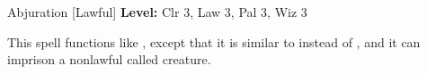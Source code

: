 {Abjuration [Lawful]}
{
	\textbf{Level:}
	Clr 3, Law 3, Pal 3, Wiz 3\\
}
{
	This spell functions like , except that it is similar to  instead of , and it can imprison a nonlawful called creature.

}

